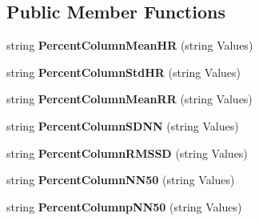 \subsection*{Public Member Functions}
\begin{DoxyCompactItemize}
\item 
\hypertarget{classusertrackmyhealth__heartrate_a0448af8c645cf94e617a5704319766d4}{string {\bfseries Percent\-Column\-Mean\-H\-R} (string Values)}\label{classusertrackmyhealth__heartrate_a0448af8c645cf94e617a5704319766d4}

\item 
\hypertarget{classusertrackmyhealth__heartrate_af618478ffdc7ad272f897636872b1cc0}{string {\bfseries Percent\-Column\-Std\-H\-R} (string Values)}\label{classusertrackmyhealth__heartrate_af618478ffdc7ad272f897636872b1cc0}

\item 
\hypertarget{classusertrackmyhealth__heartrate_a6b0a27cc137aef366ce0053bf37fe6c8}{string {\bfseries Percent\-Column\-Mean\-R\-R} (string Values)}\label{classusertrackmyhealth__heartrate_a6b0a27cc137aef366ce0053bf37fe6c8}

\item 
\hypertarget{classusertrackmyhealth__heartrate_ad7bda49d0684981c76f9bddb81978e8f}{string {\bfseries Percent\-Column\-S\-D\-N\-N} (string Values)}\label{classusertrackmyhealth__heartrate_ad7bda49d0684981c76f9bddb81978e8f}

\item 
\hypertarget{classusertrackmyhealth__heartrate_a4c9f78a614bc0191a3be34948706881f}{string {\bfseries Percent\-Column\-R\-M\-S\-S\-D} (string Values)}\label{classusertrackmyhealth__heartrate_a4c9f78a614bc0191a3be34948706881f}

\item 
\hypertarget{classusertrackmyhealth__heartrate_a3f894421bab0b748c61a2cd76d3b5750}{string {\bfseries Percent\-Column\-N\-N50} (string Values)}\label{classusertrackmyhealth__heartrate_a3f894421bab0b748c61a2cd76d3b5750}

\item 
\hypertarget{classusertrackmyhealth__heartrate_ae1c524a335673e4fad6aab26e229f97a}{string {\bfseries Percent\-Columnp\-N\-N50} (string Values)}\label{classusertrackmyhealth__heartrate_ae1c524a335673e4fad6aab26e229f97a}

\end{DoxyCompactItemize}
